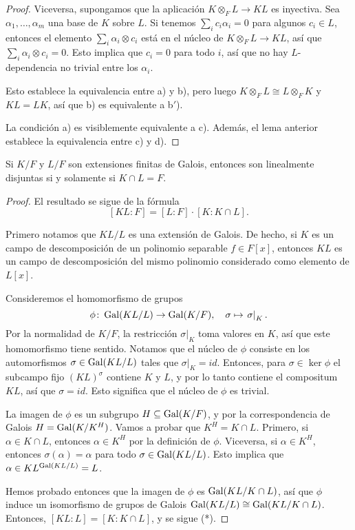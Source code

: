 \begin{proposicion-definicion}
\begin{proof}
    Viceversa, supongamos que la aplicación $K\otimes_F L\to K L$ es inyectiva.
    Sea $\alpha_1,\ldots,\alpha_m$ una base de $K$ sobre $L$. Si tenemos
    $\sum_i c_i \alpha_i = 0$ para algunos $c_i \in L$, entonces el elemento
    $\sum_i \alpha_i\otimes c_i$ está en el núcleo de $K\otimes_F L\to K L$,
    así que $\sum_i \alpha_i\otimes c_i = 0$. Esto implica que $c_i = 0$
    para todo $i$, así que no hay $L$-dependencia no trivial entre los
    $\alpha_i$.

    Esto establece la equivalencia entre a) y b), pero luego
    $K\otimes_F L \cong L\otimes_F K$ y $KL = LK$, así que b) es equivalente
    a b${}'$).

    La condición a) es visiblemente equivalente a c). Además, el lema anterior
    establece la equivalencia entre c) y d).
  \end{proof}
\end{proposicion-definicion}

\begin{proposicion}
  \label{prop:irracionalidades-naturales}
  Si $K/F$ y $L/F$ son extensiones finitas de Galois, entonces son linealmente
  disjuntas si y solamente si $K\cap L = F$.

  \begin{proof}
    El resultado se sigue de la fórmula
    \[ \tag{*} [KL : F] = [L : F] \cdot [K : K\cap L]. \]

    Primero notamos que $KL/L$ es una extensión de Galois. De hecho, si $K$ es
    un campo de descomposición de un polinomio separable $f \in F[x]$, entonces
    $KL$ es un campo de descomposición del mismo polinomio considerado como
    elemento de $L [x]$.

    Consideremos el homomorfismo de grupos
    \[ \phi\colon \operatorname{Gal} (KL/L) \to \operatorname{Gal} (K/F), \quad
       \sigma \mapsto \left.\sigma\right|_K. \]
    Por la normalidad de $K/F$, la restricción $\left.\sigma\right|_K$
    toma valores en $K$, así que este homomorfismo tiene sentido.
    Notamos que el núcleo de $\phi$ consiste en los automorfismos
    $\sigma \in \operatorname{Gal} (KL/L)$ tales que $\left.\sigma\right|_K = id$.
    Entonces, para $\sigma \in \ker\phi$ el subcampo fijo $(KL)^\sigma$ contiene
    $K$ y $L$, y por lo tanto contiene el compositum $KL$, así que $\sigma = id$.
    Esto significa que el núcleo de $\phi$ es trivial.

    La imagen de $\phi$ es un subgrupo $H \subseteq \operatorname{Gal} (K/F)$, y por la
    correspondencia de Galois $H = \operatorname{Gal} (K/K^H)$. Vamos a probar que
    $K^H = K\cap L$. Primero, si $\alpha \in K\cap L$, entonces $\alpha \in K^H$
    por la definición de $\phi$. Viceversa, si $\alpha \in K^H$, entonces
    $\sigma (\alpha) = \alpha$ para todo $\sigma \in \operatorname{Gal} (KL/L)$.
    Esto implica que $\alpha \in KL^{\operatorname{Gal} (KL/L)} = L$.

    Hemos probado entonces que la imagen de $\phi$ es $\operatorname{Gal} (KL/K\cap L)$,
    así que $\phi$ induce un isomorfismo de grupos de Galois
    $\operatorname{Gal} (KL/L) \cong \operatorname{Gal} (KL/K\cap L)$.
    Entonces, $[KL : L] = [K : K\cap L]$, y se sigue (*).
  \end{proof}
\end{proposicion}

